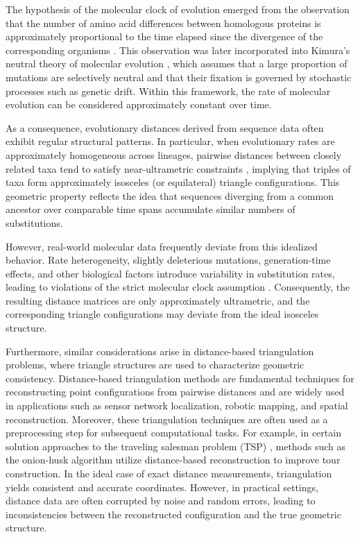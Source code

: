\documentclass[11pt]{article}
\begin{document}
The hypothesis of the molecular clock of evolution emerged from the observation that the number of amino acid differences between homologous proteins is approximately proportional to the time elapsed since the divergence of the corresponding organisms \cite{zuckerkandl1962horizons}\cite{zuckerkandl1965evolving}\cite{margoliash1963primary}. This observation was later incorporated into Kimura’s neutral theory of molecular evolution \cite{kimura1968evolutionary}\cite{kimura1969rate}\cite{kimura1985neutral}\cite{KIMURA1971}, which assumes that a large proportion of mutations are selectively neutral and that their fixation is governed by stochastic processes such as genetic drift. Within this framework, the rate of molecular evolution can be considered approximately constant over time.

As a consequence, evolutionary distances derived from sequence data often exhibit regular structural patterns. In particular, when evolutionary rates are approximately homogeneous across lineages, pairwise distances between closely related taxa tend to satisfy near-ultrametric constraints \cite{Gavryushkin_2016}, implying that triples of taxa form approximately isosceles (or equilateral) triangle configurations. This geometric property reflects the idea that sequences diverging from a common ancestor over comparable time spans accumulate similar numbers of substitutions.

However, real-world molecular data frequently deviate from this idealized behavior. Rate heterogeneity, slightly deleterious mutations, generation-time effects, and other biological factors introduce variability in substitution rates, leading to violations of the strict molecular clock assumption \cite{kimura1985neutral} \cite{kimura1980simple} \cite{gillespie1991causes} \cite{kimura1972stochastic} \cite{graur2000fundamentals}. Consequently, the resulting distance matrices are only approximately ultrametric, and the corresponding triangle configurations may deviate from the ideal isosceles structure.

Furthermore, similar considerations arise in distance-based triangulation problems, where triangle structures are used to characterize geometric consistency. Distance-based triangulation methods \cite{Melnikov2025parallel} \cite{Melnikov2025dynamic} are fundamental techniques for reconstructing point configurations from pairwise distances and are widely used in applications such as sensor network localization, robotic mapping, and spatial reconstruction. Moreover, these triangulation techniques are often used as a preprocessing step for subsequent computational tasks. For example, in certain solution approaches to the traveling salesman problem (TSP) \cite{inproceedings}, methods such as the onion-husk algorithm \cite{abramyan2024onion} utilize distance-based reconstruction to improve tour construction. In the ideal case of exact distance measurements, triangulation yields consistent and accurate coordinates. However, in practical settings, distance data are often corrupted by noise and random errors, leading to inconsistencies between the reconstructed configuration and the true geometric structure.
\end{document}
